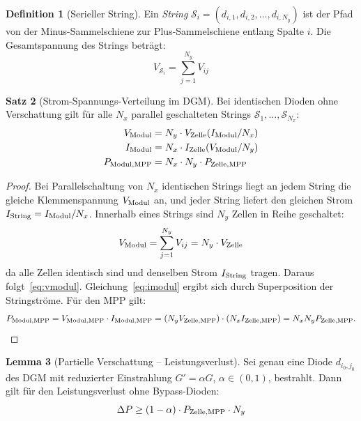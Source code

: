 ﻿\documentclass[a4paper,12pt]{article}
\theoremstyle{definition}
\newtheorem{definition}{Definition}[section]
\newtheorem{lemma}[definition]{Lemma}
\newtheorem{satz}[definition]{Satz}
\theoremstyle{remark}
\begin{document}
\begin{definition}[Serieller String]
Ein \emph{String} $\mathcal{S}_i = (d_{i,1}, d_{i,2}, \ldots, d_{i,N_y})$
ist der Pfad von der Minus-Sammelschiene zur Plus-Sammelschiene entlang
Spalte $i$. Die Gesamtspannung des Strings beträgt:
\begin{equation}
  V_{\mathcal{S}_i} = \sum_{j=1}^{N_y} V_{ij}
  \label{eq:vstring}
\end{equation}
\end{definition}

\begin{satz}[Strom-Spannungs-Verteilung im DGM]
\label{satz:netzwerk}
Bei identischen Dioden ohne Verschattung gilt für alle $N_x$ parallel
geschalteten Strings $\mathcal{S}_1, \ldots, \mathcal{S}_{N_x}$:
\begin{align}
  V_{\rm Modul} &= N_y \cdot V_{\rm Zelle}(I_{\rm Modul}/N_x) \label{eq:vmodul}\\
  I_{\rm Modul} &= N_x \cdot I_{\rm Zelle}(V_{\rm Modul}/N_y)  \label{eq:imodul}\\
  P_{\rm Modul,MPP} &= N_x \cdot N_y \cdot P_{\rm Zelle,MPP}    \label{eq:pmodul}
\end{align}
\end{satz}

\begin{proof}
Bei Parallelschaltung von $N_x$ identischen Strings liegt an jedem String
die gleiche Klemmenspannung $V_{\rm Modul}$ an, und jeder String liefert
den gleichen Strom $I_{\rm String} = I_{\rm Modul}/N_x$. Innerhalb eines
Strings sind $N_y$ Zellen in Reihe geschaltet:
\begin{equation*}
  V_{\rm Modul} = \sum_{j=1}^{N_y} V_{ij}
  = N_y \cdot V_{\rm Zelle}
\end{equation*}
da alle Zellen identisch sind und denselben Strom $I_{\rm String}$ tragen.
Daraus folgt~\eqref{eq:vmodul}. Gleichung~\eqref{eq:imodul} ergibt sich durch
Superposition der Stringströme. Für den MPP gilt:
\begin{equation*}
  P_{\rm Modul,MPP} = V_{\rm Modul,MPP} \cdot I_{\rm Modul,MPP}
    = (N_y V_{\rm Zelle,MPP}) \cdot (N_x I_{\rm Zelle,MPP})
    = N_x N_y P_{\rm Zelle,MPP}. \qedhere
\end{equation*}
\end{proof}

\begin{lemma}[Partielle Verschattung -- Leistungsverlust]
\label{lem:verschattung}
Sei genau eine Diode $d_{i_0, j_0}$ des DGM mit reduzierter Einstrahlung
$G' = \alpha G$, $\alpha \in (0,1)$, bestrahlt. Dann gilt für den
Leistungsverlust ohne Bypass-Dioden:
\begin{equation}
  \Delta P \geq (1 - \alpha) \cdot P_{\rm Zelle,MPP} \cdot N_y
  \label{eq:pverlust}
\end{equation}
\end{lemma}
\end{document}
